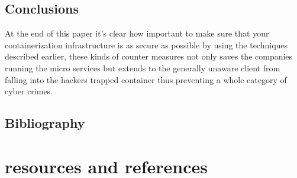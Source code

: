 \documentclass[
  14pt,
  english,
  a4paper,
]{scrreprt}
\begin{document}
\hypertarget{conclusions}{%
\section{Conclusions}\label{conclusions}}

At the end of this paper it's clear how important to make sure that your
containerization infrastructure is as secure as possible by using the
techniques described earlier, these kinds of counter measures not only
saves the companies running the micro services but extends to the
generally unaware client from falling into the hackers trapped container
thus preventing a whole category of cyber crimes.

\hypertarget{bibliography}{%
\section{Bibliography}\label{bibliography}}

\hypertarget{resources-and-references}{%
\chapter{resources and references}\label{resources-and-references}}
\end{document}
